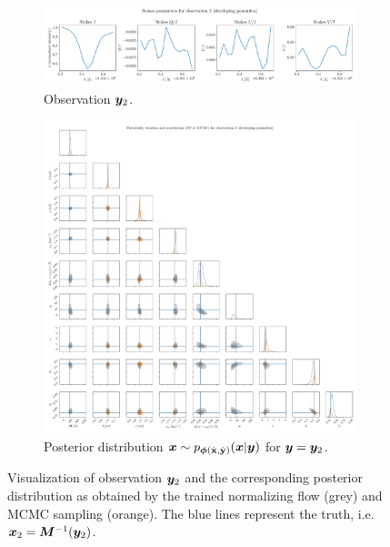 \documentclass[a4paper,11pt]{report}
\begin{document}
\begin{figure}[h!]
	\centering
	\begin{subfigure}[t]{\textwidth}
	\centering
	\includegraphics[width=\textwidth]{figures/nf-milne-eddington-example-6-corner-spectrum-2-nf-nflows-piecewisequadratic.pdf}
    \caption{Observation $\bm{y}_2$.}
	\end{subfigure}
	\begin{subfigure}[t]{\textwidth}
	\centering
	\includegraphics[width=\textwidth]{figures/nf-milne-eddington-example-6-corner-2-nf-mcmc-nflows-piecewisequadratic.pdf}
    \caption{Posterior distribution $\bm{x}\sim p_{\bm{\phi}(\hat{\boldsymbol{\mathbf{x}}},\hat{\boldsymbol{\mathbf{y}}})}(\bm{x}|\bm{y})$ for $\bm{y} = \bm{y}_2$.}
	\end{subfigure}
\cprotect\caption{Visualization of observation $\bm{y}_2$ and the corresponding posterior distribution as obtained by the trained normalizing flow (grey) and MCMC sampling (orange). The blue lines represent the truth, i.e. $\bm{x}_2 = \bm{M}^{-1}(\bm{y}_2)$.}
\label{fig:nf-milne-eddington-example-6-corner-2-nf-piecewisequadratic-results}
\end{figure}
\end{document}
